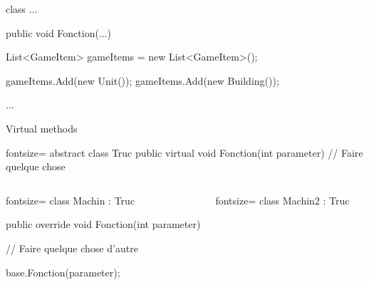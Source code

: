 \documentclass[12pt]{beamer}
\begin{document}
\begin{frame}[fragile]
    \begin{csharpcode}
class ...
{
    public void Fonction(...)
    {
        List<GameItem> gameItems = new List<GameItem>();

        gameItems.Add(new Unit());
        gameItems.Add(new Building());

        ...
    }
}
    \end{csharpcode}
\end{frame}

\begin{frame}[fragile]
    \begin{center}{\large Virtual methods}\end{center}
    \begin{csharpcode*}{fontsize=\scriptsize}
abstract class Truc
{
    public virtual void Fonction(int parameter)
    {
        // Faire quelque chose
    }
}
    \end{csharpcode*}
    \pause
    \begin{columns}
        \column{2.8in}
        \begin{csharpcode*}{fontsize=\scriptsize}
class Machin : Truc
{
    public override void Fonction(int parameter)
    {
        // Faire quelque chose d'autre

        base.Fonction(parameter);
    }
}
        \end{csharpcode*}
        \column{1.6in}
        \begin{csharpcode*}{fontsize=\scriptsize}
class Machin2 : Truc
{
}
        \end{csharpcode*}
    \end{columns}
\end{frame}
\end{document}

